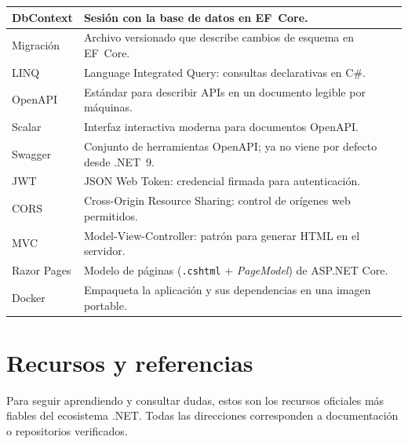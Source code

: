 \documentclass[11pt]{article}
\begin{document}
{\begin{longtable}{>{\raggedright\arraybackslash}p{3.2cm} >{\raggedright\arraybackslash}p{12.2cm}}
\ttfamily\color{netmorado}DbContext & Sesión con la base de datos en EF~Core. \\ \hline
\ttfamily\color{netmorado}Migración & Archivo versionado que describe cambios de esquema en EF~Core. \\ \hline
\ttfamily\color{netmorado}LINQ & Language Integrated Query: consultas declarativas en C\#. \\ \hline
\ttfamily\color{netmorado}OpenAPI & Estándar para describir APIs en un documento legible por máquinas. \\ \hline
\ttfamily\color{netmorado}Scalar & Interfaz interactiva moderna para documentos OpenAPI. \\ \hline
\ttfamily\color{netmorado}Swagger & Conjunto de herramientas OpenAPI; ya no viene por defecto desde .NET~9. \\ \hline
\ttfamily\color{netmorado}JWT & JSON Web Token: credencial firmada para autenticación. \\ \hline
\ttfamily\color{netmorado}CORS & Cross-Origin Resource Sharing: control de orígenes web permitidos. \\ \hline
\ttfamily\color{netmorado}MVC & Model-View-Controller: patrón para generar HTML en el servidor. \\ \hline
\ttfamily\color{netmorado}Razor Pages & Modelo de páginas (\texttt{.cshtml} + \emph{PageModel}) de ASP.NET Core. \\ \hline
\ttfamily\color{netmorado}Docker & Empaqueta la aplicación y sus dependencias en una imagen portable. \\ \hline
\end{longtable}}

\section{Recursos y referencias}
Para seguir aprendiendo y consultar dudas, estos son los recursos oficiales más fiables del ecosistema .NET. Todas las direcciones corresponden a documentación o repositorios verificados.
\end{document}
